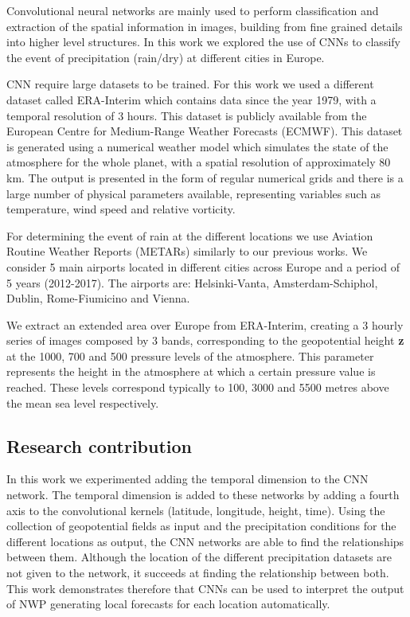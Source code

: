 Convolutional neural networks are mainly used to perform classification and extraction of the spatial information in images, building from fine grained details into higher level structures. In this work we explored the use of CNNs to classify the event of precipitation (rain/dry) at different cities in Europe. 

CNN require large datasets to be trained. For this work we used a different dataset called ERA-Interim \cite{dee2011era} which contains data since the year 1979, with a temporal resolution of 3 hours. This dataset is publicly available from the European Centre for Medium-Range Weather Forecasts (ECMWF). This dataset is generated using a numerical weather model which simulates the state of the atmosphere for the whole planet, with a spatial resolution of approximately 80 km.  The output is presented in the form of regular numerical grids and there is a large number of physical parameters available, representing variables such as temperature, wind speed and relative vorticity.

For determining the event of rain at the different locations we use Aviation Routine Weather Reports (METARs) similarly to our previous works. We consider 5 main airports located in different cities across Europe and a period of 5 years (2012-2017). The airports are: Helsinki-Vanta, Amsterdam-Schiphol, Dublin, Rome-Fiumicino and Vienna.

We extract an extended area over Europe from ERA-Interim, creating a 3 hourly series of images composed by 3 bands, corresponding to the geopotential height \textbf{z} at the 1000, 700 and 500 pressure levels of the atmosphere. This parameter represents the height in the atmosphere at which a certain pressure value is reached. These levels correspond typically to 100, 3000 and 5500 metres above the mean sea level respectively.

\subsection{Research contribution}

In this work we experimented adding the temporal dimension to the CNN network. The temporal dimension is added to these networks by adding a fourth axis to the convolutional kernels (latitude, longitude, height, time). Using the collection of geopotential fields as input and the precipitation conditions for the different locations as output, the CNN networks are able to find the relationships between them. Although the location of the different precipitation datasets are not given to the network, it succeeds at finding the relationship between both. This work demonstrates therefore that CNNs can be used to interpret the output of NWP generating local forecasts for each location automatically.

